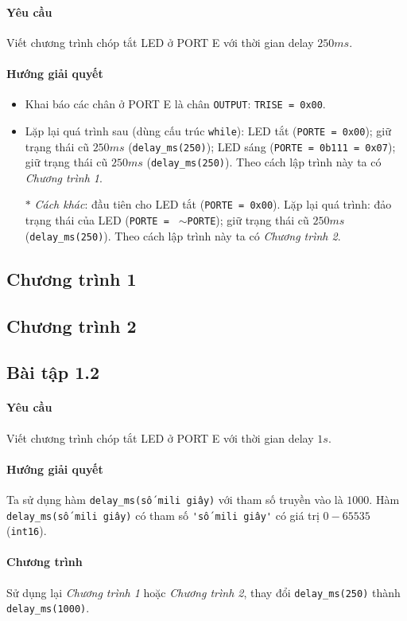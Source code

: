 \paragraph{Yêu cầu}Viết chương trình chóp tắt LED ở PORT E với thời gian delay $250ms$.
\paragraph{Hướng giải quyết} 
\begin{itemize}
\item Khai báo các chân ở PORT E là chân \verb|OUTPUT|: \verb|TRISE = 0x00|.
\item Lặp lại quá trình sau (dùng cấu trúc \verb|while|): LED tắt (\verb|PORTE = 0x00|); giữ trạng thái cũ $250ms$ (\verb|delay_ms(250)|); LED sáng (\verb|PORTE = 0b111 = 0x07|); giữ trạng thái cũ $250ms$ (\verb|delay_ms(250)|). Theo cách lập trình này ta có \textit{Chương trình 1}.
\item[$\ast$] \textit{Cách khác}: đầu tiên cho LED tắt (\verb|PORTE = 0x00|). Lặp lại quá trình: đảo trạng thái của LED (\verb|PORTE = | $\sim$\verb|PORTE|); giữ trạng thái cũ $250ms$ (\verb|delay_ms(250)|). Theo cách lập trình này ta có \textit{Chương trình 2}.
\end{itemize}
\newpage
\subsection*{Chương trình 1}

\subsection*{Chương trình 2}

\newpage
\subsection{Bài tập 1.2}
\paragraph{Yêu cầu}Viết chương trình chóp tắt LED ở PORT E với thời gian delay $1s$.
\paragraph{Hướng giải quyết} Ta sử dụng hàm \verb|delay_ms(số mili giây)| với tham số truyền vào là $1000$. Hàm \verb|delay_ms(số mili giây)| có tham số \verb|'số mili giây'| có giá trị $0 - 65535$ (\verb|int16|).
\paragraph{Chương trình}Sử dụng lại \textit{Chương trình 1} hoặc \textit{Chương trình 2}, thay đổi \verb|delay_ms(250)| thành \verb|delay_ms(1000)|.
